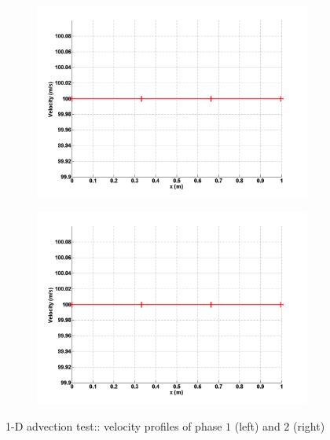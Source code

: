 %
\begin{figure}[H]
        \centering
        \begin{subfigure}[b]{0.495\textwidth}
                \centering
                \includegraphics[width=\textwidth]{figures/SEM/liquid_velocity.png}
                \caption{\label{ig:vel-1-7-eqn-sect4}}
        \end{subfigure}%
        \begin{subfigure}[b]{0.495\textwidth}
                \centering
                \includegraphics[width=\textwidth]{figures/SEM/vapor_velocity.png}
                \caption{\label{ig:vel-2-7-eqn-sect4}}
        \end{subfigure}
        \caption{1-D advection test:: velocity profiles of phase $1$ (left) and $2$ (right)\label{fig:vel-7-sect4}}
\end{figure}
